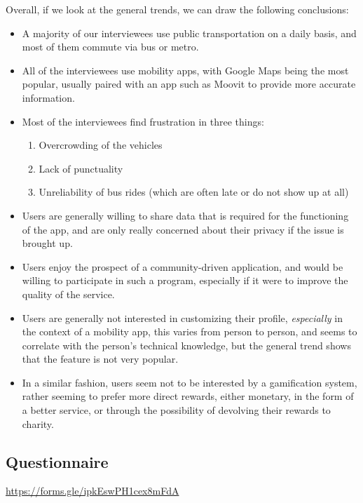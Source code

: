 \documentclass[a4paper, 11pt]{report}
\begin{document}
Overall, if we look at the general trends, we can draw the following conclusions:

\begin{itemize}
	\item A majority of our interviewees use public transportation on a daily basis, and most of
	      them commute via bus or metro.
	\item All of the interviewees use mobility apps, with Google Maps being the most popular,
	      usually paired with an app such as Moovit to provide more accurate information.
	\item Most of the interviewees find frustration in three things:
	      \begin{enumerate}
		      \item Overcrowding of the vehicles
		      \item Lack of punctuality
		      \item Unreliability of bus rides (which are often late or do not show up at all)
	      \end{enumerate}
	\item Users are generally willing to share data that is required for the functioning of the app,
	      and are only really concerned about their privacy if the issue is brought up.
	\item Users enjoy the prospect of a community-driven application, and would be willing to
	      participate in such a program, especially if it were to improve the quality of the service.
	\item Users are generally not interested in customizing their profile, \emph{especially}
	      in the context of a mobility app, this varies from person to person, and seems to correlate
	      with the person's technical knowledge, but the general trend shows that the feature is not
	      very popular.
	\item In a similar fashion, users seem not to be interested by a gamification system, rather
	      seeming to prefer more direct rewards, either monetary, in the form of a better service, or through
	      the possibility of devolving their rewards to charity.
\end{itemize}

\subsection{Questionnaire}\label{ssec:questionnaire}

\url{https://forms.gle/ipkEswPH1cex8mFdA}
\end{document}
